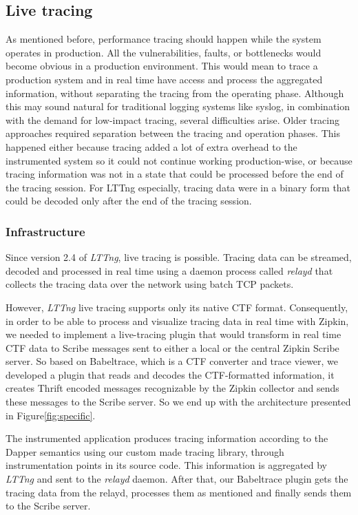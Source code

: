 \documentclass[a4paper,10pt,twocolumn]{article}
\begin{document}
\subsection{Live tracing} 
As mentioned before, performance tracing should happen while the system operates
in production. All the vulnerabilities, faults, or bottlenecks would become
obvious in a production environment. This would mean to trace a production
system and in real time have access and process the aggregated information,
without separating the tracing from the operating phase. Although this may sound
natural for traditional logging systems like syslog, in combination with the
demand for low-impact tracing, several difficulties arise. Older tracing
approaches required separation between the tracing and operation phases. This
happened either because tracing added a lot of extra overhead to the
instrumented system so it could not continue working production-wise, or because
tracing information was not in a state that could be processed before the end of
the tracing session. For LTTng especially, tracing data were in a binary form
that could be decoded only after the end of the tracing session. 

\subsubsection{Infrastructure} Since version 2.4 of \emph{LTTng}, live tracing
is possible. Tracing data can be streamed, decoded and processed in real time
using a daemon process called \emph{relayd} that collects the tracing data over
the network using batch TCP packets.  

However, \emph{LTTng} live tracing supports only its native CTF format.
Consequently, in order to be able to process and visualize tracing data in real
time with Zipkin, we needed to implement a live-tracing plugin that would
transform in real time CTF data to Scribe messages sent to either a local or the
central Zipkin Scribe server. So based on Babeltrace\cite{bltrace}, which is a
CTF converter and trace viewer, we developed a plugin that reads and decodes the
CTF-formatted information, it creates Thrift\cite{thrift} encoded messages
recognizable by the Zipkin collector and sends these messages to the Scribe
server. So we end up with the architecture presented in
Figure\ref{fig:specific}.

The instrumented application produces tracing information according to the
Dapper semantics using our custom made tracing library, through instrumentation
points in its source code. This information is aggregated by \emph{LTTng} and
sent to the \emph{relayd} daemon. After that, our Babeltrace plugin gets the
tracing data from the relayd, processes them as mentioned and finally sends them
to the Scribe server. 
\end{document}
